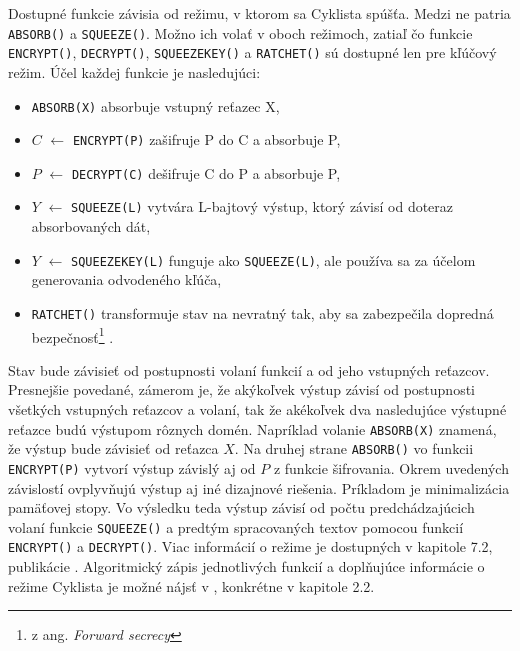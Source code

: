 Dostupné funkcie závisia od režimu, v ktorom sa  Cyklista spúšťa. Medzi ne patria \lstinline|ABSORB()| a \lstinline|SQUEEZE()|. Možno ich volať v oboch režimoch, zatiaľ čo funkcie \lstinline|ENCRYPT()|, \lstinline|DECRYPT()|, \lstinline|SQUEEZEKEY()| a \lstinline|RATCHET()| sú dostupné len pre kľúčový režim. Účel každej funkcie je nasledujúci:
\begin{itemize}
	\item \lstinline|ABSORB(X)| absorbuje vstupný reťazec X,
	\item $C$ $\gets$ \lstinline|ENCRYPT(P)| zašifruje P do C a absorbuje P,
	\item $P$ $\gets$ \lstinline|DECRYPT(C)| dešifruje C do P a absorbuje P,
	\item $Y$ $\gets$	\lstinline|SQUEEZE(L)|  vytvára L-bajtový výstup, ktorý závisí od doteraz absorbovaných dát,
	\item $Y$ $\gets$	\lstinline|SQUEEZEKEY(L)| funguje ako \lstinline|SQUEEZE(L)|, ale používa sa za účelom generovania odvodeného kľúča,
	\item \lstinline|RATCHET()| transformuje stav na nevratný tak, aby sa zabezpečila dopredná bezpečnosť\footnote{z ang. \textit{Forward secrecy}} \cite{fsec}. 
\end{itemize}

Stav bude závisieť od postupnosti volaní funkcií a od jeho vstupných reťazcov. Presnejšie povedané, zámerom je, že akýkoľvek výstup závisí od postupnosti všetkých vstupných reťazcov a volaní, tak že akékoľvek dva nasledujúce výstupné reťazce budú výstupom rôznych domén. Napríklad volanie \lstinline|ABSORB(X)| znamená, že výstup bude závisieť od reťazca $X$. Na druhej strane \lstinline|ABSORB()| vo funkcii \lstinline|ENCRYPT(P)| vytvorí výstup závislý aj od $P$ z funkcie šifrovania. Okrem uvedených závislostí ovplyvňujú výstup aj iné dizajnové riešenia. Príkladom je minimalizácia pamäťovej stopy. Vo výsledku teda výstup závisí od počtu predchádzajúcich volaní funkcie \lstinline|SQUEEZE()| a predtým spracovaných textov pomocou funkcií \lstinline|ENCRYPT()| a \lstinline|DECRYPT()|. Viac informácií o režime je dostupných v kapitole 7.2, publikácie \cite{xcb}.
Algoritmický zápis jednotlivých funkcií a doplňujúce informácie o režime Cyklista je možné nájsť v \cite{xdr2}, konkrétne v kapitole 2.2. 

